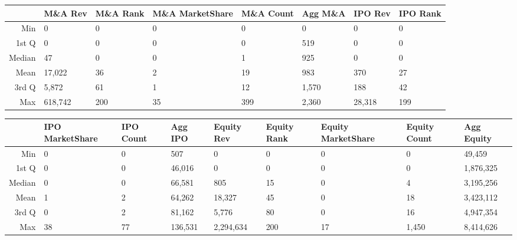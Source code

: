 \documentclass{article}
\begin{document}
\begin{table}[H]
\centering
\begin{tabular}{rlllllll}
  \hline
 & M\&A Rev & M\&A  Rank & M\&A MarketShare & M\&A Count & Agg M\&A  & IPO Rev & IPO  Rank \\ 
  \hline
Min & 0 & 0 & 0 & 0 & 0 & 0 & 0 \\ 
  1st Q & 0 & 0 & 0 & 0 & 519 & 0 & 0 \\ 
  Median & 47 & 0 & 0 & 1 & 925 & 0 & 0 \\ 
  Mean & 17,022 & 36 & 2 & 19 & 983 & 370 & 27 \\ 
  3rd Q & 5,872 & 61 & 1 & 12 & 1,570 & 188 & 42 \\ 
  Max & 618,742 & 200 & 35 & 399 & 2,360 & 28,318 & 199 \\ 
   \hline
\end{tabular}
\end{table}
\begin{table}[H]
\centering
\begin{tabular}{rllllllll}
  \hline
 & IPO MarketShare & IPO Count & Agg IPO  & Equity Rev & Equity  Rank & Equity MarketShare & Equity Count & Agg Equity  \\ 
  \hline
Min & 0 & 0 & 507 & 0 & 0 & 0 & 0 & 49,459 \\ 
  1st Q & 0 & 0 & 46,016 & 0 & 0 & 0 & 0 & 1,876,325 \\ 
  Median & 0 & 0 & 66,581 & 805 & 15 & 0 & 4 & 3,195,256 \\ 
  Mean & 1 & 2 & 64,262 & 18,327 & 45 & 0 & 18 & 3,423,112 \\ 
  3rd Q & 0 & 2 & 81,162 & 5,776 & 80 & 0 & 16 & 4,947,354 \\ 
  Max & 38 & 77 & 136,531 & 2,294,634 & 200 & 17 & 1,450 & 8,414,626 \\ 
   \hline
\end{tabular}
\end{table}
\end{document}
